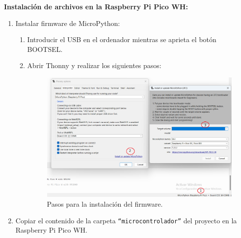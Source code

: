 \documentclass{article}
\begin{document}
\textbf{Instalación de archivos en la Raspberry Pi Pico WH:}
\begin{enumerate}
	\item Instalar firmware de MicroPython:
		\begin{enumerate}
			\item Introducir el USB en el ordenador mientras se aprieta el botón BOOTSEL.
			\item Abrir Thonny y realizar los siguientes pasos:
			\begin{figure}[H]
			\centering
			\includegraphics[width=0.8\linewidth]{../images/instalacion_firmware.png}
			\caption{\label{fig:instalación firmware}Pasos para la instalación del firmware.}
			\end{figure}
		\end{enumerate}
			\item Copiar el contenido de la carpeta \texttt{``microcontrolador''} del proyecto en la Raspberry Pi Pico WH.
\end{enumerate}
\end{document}

